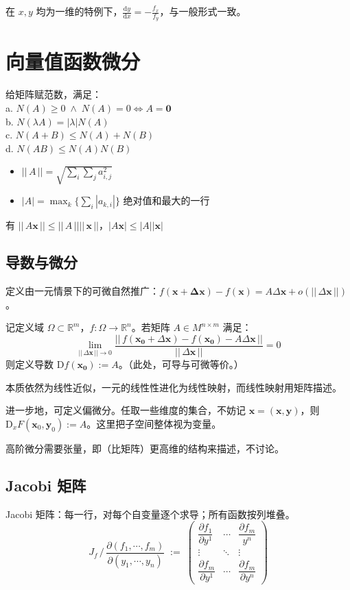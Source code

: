 \documentclass[12pt, a4paper, UTF8, openany]{ctexbook}
\newcommand{\dif}{\mathrm{d}}
\newcommand{\Dif}{\mathrm{D}}
\newcommand{\field}[1]{\mathbb{#1}}%
\newcommand{\mat}[1]{\mathbf{#1}}
\newcommand{\len}[1]{||\, #1 \,||}%
\begin{document}
        在 $x, y$ 均为一维的特例下，$\frac{\dif y}{\dif x} = -\frac{f_x}{f_y}$，与一般形式一致。

    \section{向量值函数微分}
    给矩阵赋范数，满足：\\
    a. $N(A) \geqslant 0 \; \land \; N(A) = 0 \iff A = \mat{0}$ \\
    b. $N(\lambda A) = |\lambda|N(A)$ \\
    c. $N(A + B) \leqslant N(A) + N(B)$ \\
    d. $N(AB) \leqslant N(A)N(B)$

    \begin{itemize}
        \item $\len{A} = \sqrt{\sum_i\sum_j a_{i, j}^2}$
        \item $|A| = \max_k\{ \sum_{i} |a_{k, i}| \}$ 绝对值和最大的一行
    \end{itemize}
    有 $\len{A\mat{x}} \leqslant \len{A}\len{\mat{x}}$，$|A\mat{x}| \leqslant |A||\mat{x}|$

        \subsection{导数与微分}
        定义由一元情景下的可微自然推广：$f(\mat{x + \Delta x}) - f(\mat{x}) = A\Delta\mat{x} + o(\len{\Delta\mat{x}})$。

        记定义域 $\Omega \subset \field{R}^m$，$f: \Omega \to \field{R}^n$。若{\heiti 矩阵} $A \in M^{n \times m}$ 满足：
        $$\lim_{\len{\Delta \mat{x}} \to 0} \frac{\len{f(\mat{x_0} + \Delta\mat{x}) - f(\mat{x_0}) - A\Delta\mat{x}}}{\len{\Delta \mat{x}}} = 0$$
        则定义导数 $\Dif f(\mat{x_0}) := A$。（此处，可导与可微等价。）

        本质依然为线性近似，一元的线性性进化为线性映射，而线性映射用矩阵描述。

        进一步地，可定义偏微分。任取一些维度的集合，不妨记 $\mat{x} = (\mat{x}, \mat{y})$，则 $\Dif_x F(\mat{x}_0, \mat{y}_0) := A$。这里把子空间整体视为变量。

        高阶微分需要张量，即（比矩阵）更高维的结构来描述，不讨论。

        \subsection{Jacobi 矩阵}
        Jacobi 矩阵：每一行，对每个自变量逐个求导；所有函数按列堆叠。
        $$J_f \, / \, \frac{\partial (f_1, \cdots, f_m)}{\partial (y_1, \cdots, y_n)} \; := \; \begin{pmatrix}
            \dfrac{\partial f_1}{\partial y^1} & \cdots & \dfrac{\partial f_m}{y^n} \\
            \vdots & \ddots & \vdots \\
            \dfrac{\partial f_m}{\partial y^1} & \cdots & \dfrac{\partial f_m}{\partial y^n}
        \end{pmatrix}$$
\end{document}

